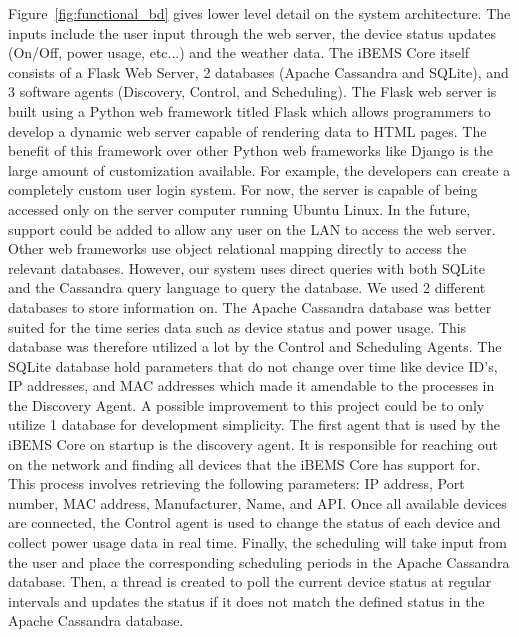 Figure~\ref{fig:functional_bd} gives lower level detail on the system architecture. The inputs include the user input through the web server, the device status updates (On/Off, power usage, etc...) and the weather data. The iBEMS Core itself consists of a Flask Web Server, 2 databases (Apache Cassandra and SQLite), and 3 software agents (Discovery, Control, and Scheduling).
\medbreak
The Flask web server is built using a Python web framework titled Flask which allows programmers to develop a dynamic web server capable of rendering data to HTML pages. The benefit of this framework over other Python web frameworks like Django is the large amount of customization available. For example, the developers can create a completely custom user login system. For now, the server is capable of being accessed only on the server computer running Ubuntu Linux. In the future, support could be added to allow any user on the LAN to access the web server. Other web frameworks use object relational mapping directly to access the relevant databases. However, our system uses direct queries with both SQLite and the Cassandra query language to query the database.
\medbreak
We used 2 different databases to store information on. The Apache Cassandra database was better suited for the time series data such as device status and power usage. This database was therefore utilized a lot by the Control and Scheduling Agents. The SQLite database hold parameters that do not change over time like device ID's, IP addresses, and MAC addresses which made it amendable to the processes in the Discovery Agent. A possible improvement to this project could be to only utilize 1 database for development simplicity.
\medbreak
The first agent that is used by the iBEMS Core on startup is the discovery agent. It is responsible for reaching out on the network and finding all devices that the iBEMS Core has support for. This process involves retrieving the following parameters: IP address, Port number, MAC address, Manufacturer, Name, and API.
Once all available devices are connected, the Control agent is used to change the status of each device and collect power usage data in real time. Finally, the scheduling will take input from the user and place the corresponding scheduling periods in the Apache Cassandra database. Then, a thread is created to poll the current device status at regular intervals and updates the status if it does not match the defined status in the Apache Cassandra database.

